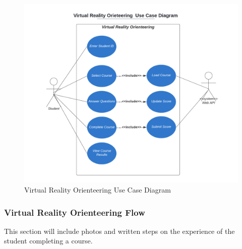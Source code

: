 \begin{figure}[htb]
	\centering
	\includegraphics[width=.9\textwidth]{Requirements/assets/vr-use-case-diagram.png}
	\caption[Virutal Reality Orienteering Use Case Diagram]{\label{Virutal Reality Orienteering Use Case Diagram}Virtual Reality Orienteering Use Case Diagram}
\end{figure}

\subsubsection{Virtual Reality Orienteering Flow}
This section will include photos and written steps on the experience of the student completing a course.

